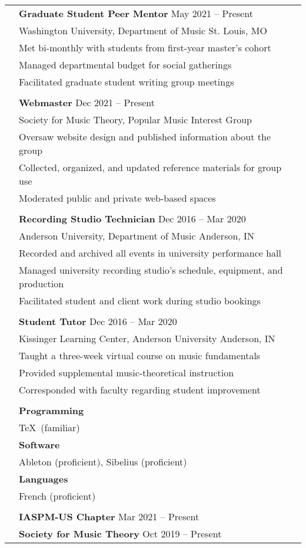 \documentclass[letterpaper, 11pt]{article}
\begin{document}
\begin{longtable}{p{1.3in}p{4.8in}}
& \textbf{Graduate Student Peer Mentor} \hfill May 2021  -- Present \\
& Washington University, Department of Music \hfill St. Louis, MO\\
& Met bi-monthly with students from first-year master's cohort \\
& Managed departmental budget for social gatherings \\
& Facilitated graduate student writing group meetings \\
& \\

{\color{OliveGreen}{Professional Service}}
& \textbf{Webmaster} \hfill Dec 2021  -- Present \\
& Society for Music Theory, Popular Music Interest Group\\
& Oversaw website design and published information about the group \\
& Collected, organized, and updated reference materials for group use\\
& Moderated public and private web-based spaces \\
& \\


& \textbf{Recording Studio Technician} \hfill Dec 2016 -- Mar 2020 \\
&  Anderson University, Department of Music \hfill Anderson, IN \\
& Recorded and archived all events in university performance hall \\
& Managed university recording studio's schedule, equipment, and production \\
& Facilitated student and client work during studio bookings \\
& \\

& \textbf{Student Tutor} \hfill Dec 2016 -- Mar 2020 \\
& Kissinger Learning Center, Anderson University \hfill Anderson, IN \\
& Taught a three-week virtual course on music fundamentals \\
& Provided supplemental music-theoretical instruction \\
& Corresponded with faculty regarding student improvement \\
& \\

{\color{OliveGreen}{Proficiencies}} 
& \textbf{Programming} \\
& \TeX~(familiar) \\
& \textbf{Software} \\
& Ableton (proficient), Sibelius (proficient) \\
& \textbf{Languages} \\
& French (proficient) \\
& \\


{\color{OliveGreen}{Memberships}} 
& \textbf{IASPM-US Chapter} \hfill Mar 2021 -- Present \\
& \textbf{Society for Music Theory} \hfill Oct 2019 -- Present \\
\end{longtable}
\end{document}
